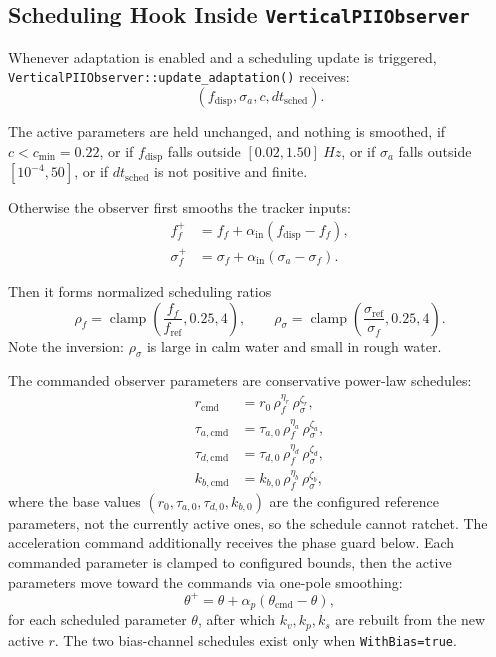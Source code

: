 \documentclass[conference]{IEEEtran}
\DeclareMathOperator{\clamp}{clamp}
\begin{document}
    \subsection{Scheduling Hook Inside \texttt{VerticalPIIObserver}}

    Whenever adaptation is enabled and a scheduling update is triggered,
    \texttt{VerticalPIIObserver::update\_adaptation()} receives:
    \begin{equation}
    (f_{\mathrm{disp}},\sigma_a,c,dt_{\mathrm{sched}}).
    \end{equation}

    The active parameters are held unchanged, and nothing is smoothed, if
    \(c < c_{\min} = 0.22\), or if \(f_{\mathrm{disp}}\) falls outside
    \([0.02,1.50]~\si{Hz}\), or if \(\sigma_a\) falls outside
    \([10^{-4},50]\), or if \(dt_{\mathrm{sched}}\) is not positive and finite.

    Otherwise the observer first smooths the tracker inputs:
    \begin{align}
        f_f^{+} &= f_f + \alpha_{\mathrm{in}}(f_{\mathrm{disp}}-f_f),\\
        \sigma_f^{+} &= \sigma_f + \alpha_{\mathrm{in}}(\sigma_a-\sigma_f).
    \end{align}

    Then it forms normalized scheduling ratios
    \begin{equation}
        \rho_f = \clamp\!\left(\frac{f_f}{f_{\mathrm{ref}}},0.25,4\right),
        \qquad
        \rho_\sigma = \clamp\!\left(\frac{\sigma_{\mathrm{ref}}}{\sigma_f},0.25,4\right).
    \end{equation}
    Note the inversion: \(\rho_\sigma\) is large in calm water and small in rough
    water.

    The commanded observer parameters are conservative power-law schedules:
    \begin{align}
        r_{\mathrm{cmd}} &=
        r_0\,\rho_f^{\eta_r}\,\rho_\sigma^{\zeta_r},\\
        \tau_{a,\mathrm{cmd}} &=
        \tau_{a,0}\,\rho_f^{\eta_a}\,\rho_\sigma^{\zeta_a},\\
        \tau_{d,\mathrm{cmd}} &=
        \tau_{d,0}\,\rho_f^{\eta_d}\,\rho_\sigma^{\zeta_d},\\
        k_{b,\mathrm{cmd}} &=
        k_{b,0}\,\rho_f^{\eta_b}\,\rho_\sigma^{\zeta_b},
    \end{align}
    where the base values \((r_0,\tau_{a,0},\tau_{d,0},k_{b,0})\) are the
    configured reference parameters, not the currently active ones, so the
    schedule cannot ratchet. The acceleration command additionally receives the phase guard below.
    Each commanded parameter is clamped to configured bounds, then the active parameters move toward the commands via one-pole
    smoothing:
    \begin{equation}
        \theta^{+}
        =
        \theta + \alpha_p(\theta_{\mathrm{cmd}}-\theta),
    \end{equation}
    for each scheduled parameter \(\theta\), after which \(k_v,k_p,k_s\) are
    rebuilt from the new active \(r\). The two bias-channel schedules exist only
    when \texttt{WithBias=true}.
\end{document}
